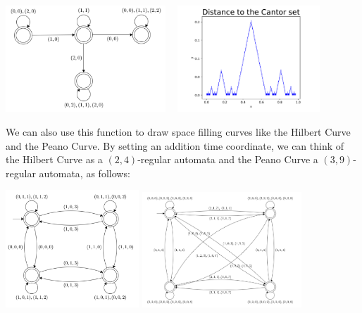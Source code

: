 \documentclass[10pt,usenames,dvipsnames]{article}
\begin{document}
\begin{center}
    \includegraphics[width=6cm]{FA20/images/fractals/cantord-automata.png}
    \includegraphics[width=6cm,height=4cm]{FA20/images/fractals/cantord.pdf}
\end{center}

We can also use this function to draw space filling curves like the Hilbert Curve and the Peano Curve. By setting an addition time coordinate, we can think of the Hilbert Curve as a $(2,4)$-regular automata and the Peano Curve a $(3,9)$-regular automata, as follows:

\begin{center}
    \includegraphics[width=5cm]{FA20/images/fractals/hilbert-automata.png}
    \includegraphics[width=6cm]{FA20/images/fractals/peano-automata.png}
\end{center}
\end{document}
